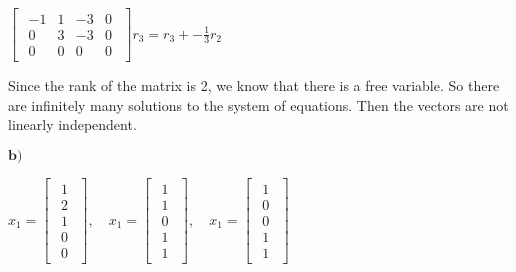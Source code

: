 \singlespacing

\begin{math}
    \begin{bmatrix}
        \begin{array}{ccc|c}
            -1 & 1 & -3 & 0 \\
            0  & 3 & -3 & 0 \\
            0  & 0 & 0  & 0
        \end{array}
    \end{bmatrix}r_3 = r_3 + -\frac{1}{3}r_2
\end{math}

\singlespacing

Since the rank of the matrix is 2, we know that there is a free variable. So
there are infinitely many solutions to the system of equations. Then the vectors
are not linearly independent.

\singlespacing
\break
$\textbf{b)}$

\singlespacing

\begin{math}
    x_1 = \begin{bmatrix}
        \begin{array}{c}
            1 \\
            2 \\
            1 \\
            0 \\
            0
        \end{array}
    \end{bmatrix},\quad
    x_1 = \begin{bmatrix}
        \begin{array}{c}
            1 \\
            1 \\
            0 \\
            1 \\
            1
        \end{array}
    \end{bmatrix},\quad
    x_1 = \begin{bmatrix}
        \begin{array}{c}
            1 \\
            0 \\
            0 \\
            1 \\
            1
        \end{array}
    \end{bmatrix}
\end{math}

